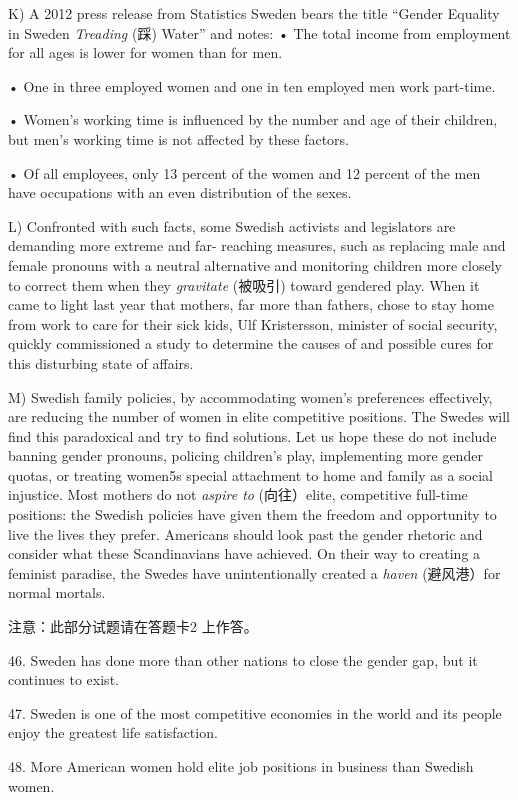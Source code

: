 \documentclass[UTF8,11pt]{ctexart}
\begin{document}
K) A 2012 press release from Statistics Sweden bears the title “Gender Equality in Sweden\textit{ Treading} (踩) Water” and notes: • The total income from employment for all ages is lower for women than for men.


• One in three employed women and one in ten employed men work part-time.


• Women’s working time is influenced by the number and age of their children, but men’s working time is not affected by these factors.


• Of all employees, only 13 percent of the women and 12 percent of the men have occupations with an even distribution of the sexes.


L) Confronted with such facts, some Swedish activists and legislators are demanding more extreme and far- reaching measures, such as replacing male and female pronouns with a neutral alternative and monitoring children more closely to correct them when they\textit{ gravitate} (被吸引) toward gendered play. When it came to light last year that mothers, far more than fathers, chose to stay home from work to care for their sick kids, Ulf Kristersson, minister of social security, quickly commissioned a study to determine the causes of and possible cures for this disturbing state of affairs.


M) Swedish family policies, by accommodating women’s preferences effectively, are reducing the number of women in elite competitive positions. The Swedes will find this paradoxical and try to find solutions. Let us hope these do not include banning gender pronouns, policing children’s play, implementing more gender quotas, or treating women5s special attachment to home and family as a social injustice. Most mothers do not\textit{ aspire to} (向往）elite, competitive full-time positions: the Swedish policies have given them the freedom and opportunity to live the lives they prefer. Americans should look past the gender rhetoric and consider what these Scandinavians have achieved. On their way to creating a feminist paradise, the Swedes have unintentionally created a\textit{ haven} (避风港）for normal mortals.


注意：此部分试题请在答题卡2 上作答。


46. Sweden has done more than other nations to close the gender gap, but it continues to exist.


47. Sweden is one of the most competitive economies in the world and its people enjoy the greatest life satisfaction.


48. More American women hold elite job positions in business than Swedish women.
\end{document}
